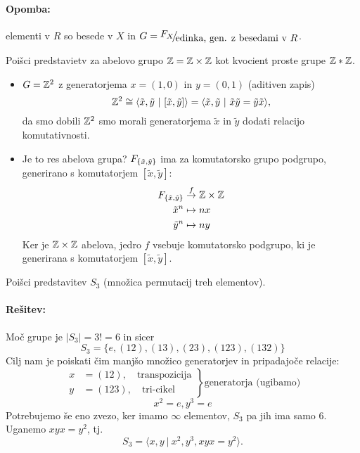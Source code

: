 \paragraph{Opomba:} elementi v $R$ so besede v $X$ in $G = \quot{F_X}{\text{edinka, gen. z besedami v $R$}}$.

\begin{zgled}
	Poi\v sci predstavietv za abelovo grupo $\mathbb{Z} = \mathbb{Z} \times \mathbb{Z}$ kot kvocient proste grupe $\mathbb{Z} * \mathbb{Z}$.
	\begin{itemize}
		\item{$G = \mathbb{Z}^2$ z generatorjema $x = (1, 0)$ in $y = (0, 1)$ (aditiven zapis)
			\[
				\mathbb{Z}^2 \cong \langle \tilde{x}, \tilde{y}\ |\ [\tilde{x}, \tilde{y}]\rangle =
					\langle \tilde{x}, \tilde{y}\ |\ \tilde{x}\tilde{y} = \tilde{y}\tilde{x} \rangle,
			\]
			da smo dobili $\mathbb{Z}^2$ smo morali generatorjema $\tilde{x}$ in $\tilde{y}$ dodati relacijo komutativnosti.}
		\item{Je to res abelova grupa? $F_{ \{  \tilde{x}, \tilde{y}  \} }$ ima za komutatorsko grupo podgrupo,
			generirano s komutatorjem $[\tilde{x}, \tilde{y}]$:
			\begin{align*}
				F_{ \{  \tilde{x}, \tilde{y}  \} } &\stackrel{f}{\to} \mathbb{Z} \times \mathbb{Z} \\
				\tilde{x}^n &\mapsto nx \\
				\tilde{y}^n &\mapsto ny
			\end{align*}
			Ker je $\mathbb{Z} \times \mathbb{Z}$ abelova, jedro $f$ vsebuje komutatorsko podgrupo, ki je generirana s komutatorjem
			$[\tilde{x}, \tilde{y}]$.
		}
	\end{itemize}
\end{zgled}

\begin{zgled}
	Poi\v sci predstavitev $S_3$ (mno\v zica permutacij treh elementov).
	\paragraph{Re\v sitev:}
	Mo\v c grupe je $|S_3| = 3! = 6$ in sicer
	\[
		S_3 = \{e, (12), (13), (23), (123), (132)\}
	\]
	Cilj nam je poiskati \v cim manj\v so mno\v zico generatorjev in pripadajo\v ce relacije:
	\[
		\left.
		\begin{array}{rl}
			x &= (12), \quad \text{transpozicija} \\
			y &= (123), \quad \text{tri-cikel}
		\end{array}\right\} \text{generatorja (ugibamo)}
	\]
	\[
		x^2 = e, y^3 = e
	\]
	Potrebujemo \v se eno zvezo, ker imamo $\infty$ elementov, $S_3$ pa jih ima samo 6. Uganemo $xyx = y^2$, tj.
	\[
		S_3 = \langle x, y\ |\ x^2, y^3, xyx = y^2 \rangle.
	\]
\end{zgled}\vspace{-6ex}

